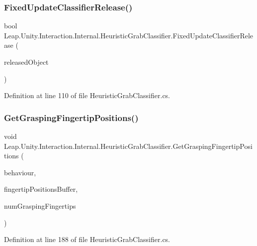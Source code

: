 \subsubsection{\texorpdfstring{FixedUpdateClassifierRelease()}{FixedUpdateClassifierRelease()}}
{\footnotesize\ttfamily bool Leap.\+Unity.\+Interaction.\+Internal.\+Heuristic\+Grab\+Classifier.\+Fixed\+Update\+Classifier\+Release (\begin{DoxyParamCaption}\item[{out \mbox{\hyperlink{interface_leap_1_1_unity_1_1_interaction_1_1_i_interaction_behaviour}{I\+Interaction\+Behaviour}}}]{released\+Object }\end{DoxyParamCaption})}



Definition at line 110 of file Heuristic\+Grab\+Classifier.\+cs.

\mbox{\label{class_leap_1_1_unity_1_1_interaction_1_1_internal_1_1_heuristic_grab_classifier_a54611fe455fec49241a629b7d9eea6c6}} 
\subsubsection{\texorpdfstring{GetGraspingFingertipPositions()}{GetGraspingFingertipPositions()}}
{\footnotesize\ttfamily void Leap.\+Unity.\+Interaction.\+Internal.\+Heuristic\+Grab\+Classifier.\+Get\+Grasping\+Fingertip\+Positions (\begin{DoxyParamCaption}\item[{\mbox{\hyperlink{interface_leap_1_1_unity_1_1_interaction_1_1_i_interaction_behaviour}{I\+Interaction\+Behaviour}}}]{behaviour,  }\item[{Vector3 \mbox{[}$\,$\mbox{]}}]{fingertip\+Positions\+Buffer,  }\item[{out int}]{num\+Grasping\+Fingertips }\end{DoxyParamCaption})}



Definition at line 188 of file Heuristic\+Grab\+Classifier.\+cs.

